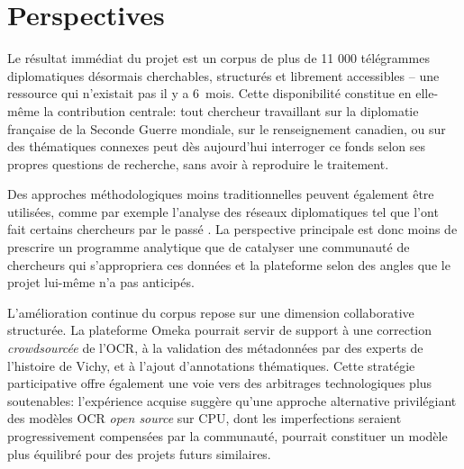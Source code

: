 \documentclass[final,fra]{anthology-ch}         %
\begin{document}
\section{Perspectives}\label{perspectives}

Le résultat immédiat du projet est un corpus de plus de 11 000
télégrammes diplomatiques désormais cherchables, structurés et librement
accessibles -- une ressource qui n'existait pas il y a 6~mois. Cette
disponibilité constitue en elle-même la contribution centrale: tout
chercheur travaillant sur la diplomatie française de la Seconde Guerre
mondiale, sur le renseignement canadien, ou sur des thématiques connexes
peut dès aujourd'hui interroger ce fonds selon ses propres questions de
recherche, sans avoir à reproduire le traitement.

Des approches méthodologiques moins traditionnelles peuvent également
être utilisées, comme par exemple l'analyse des réseaux diplomatiques
tel que l'ont fait certains chercheurs par le passé \cite{bloch_networks_2022,jo_diplomatic_2016}.
La perspective principale est donc moins de prescrire un programme
analytique que de catalyser une communauté de chercheurs qui
s'appropriera ces données et la plateforme selon des angles que le
projet lui-même n'a pas anticipés.

L'amélioration continue du corpus repose sur une dimension collaborative
structurée. La plateforme Omeka pourrait servir de support à une
correction \emph{crowdsourcée} de l'OCR, à la validation des métadonnées
par des experts de l'histoire de Vichy, et à l'ajout d'annotations
thématiques. Cette stratégie participative offre également une voie vers
des arbitrages technologiques plus soutenables: l'expérience acquise
suggère qu'une approche alternative privilégiant des modèles OCR
\emph{open source} sur CPU, dont les imperfections seraient
progressivement compensées par la communauté, pourrait constituer un
modèle plus équilibré pour des projets futurs similaires.

\nocite{bloch_networks_2022,}
\nocite{dpt_national_defence}
\nocite{eberlee_scholar_2024}
\nocite{CNRS_empreinte_2026}
\nocite{examination_textual_record}
\nocite{hawkins_archives_2022}
\nocite{jensen_cautious_2008}
\nocite{jo_diplomatic_2016}
\nocite{knoedlseder_secnarios_2024}
\nocite{mistralocr2026}
\nocite{wesley_cryptographic_1987}
\printbibliography
\end{document}
